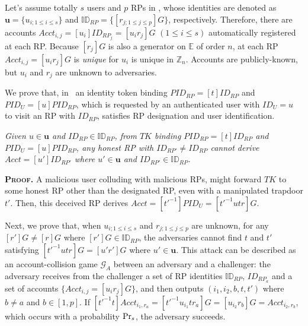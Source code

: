 
Let's assume totally $s$ users and $p$ RPs in \usso,
    whose identities are denoted as $\mathbf{u} = \{u_{i; 1 \leq i \leq s}\}$ and $\mathbb{ID}_{RP} = \{[r_{j;1 \leq j \leq p}]G\}$, respectively.
Therefore, there are accounts $Acct_{i,j}=[u_i]ID_{RP_j} = [u_i r_j]G$ $(1 \leq i \leq s)$ automatically registered at each RP.
Because $[r_j]G$ is also a generator on $\mathbb{E}$ of order $n$,
    at each RP $Acct_{i,j}=[u_i r_j]G$ is \emph{unique} for $u_i$ is unique in $\mathbb{Z}_n$.
Accounts are publicly-known, but $u_{i}$ and $r_{j}$ are unknown to adversaries.

We prove that, in \usso\ 
an identity token binding $PID_{RP} = [t]ID_{RP}$ and $PID_U = [u]PID_{RP}$, which is requested by an authenticated user with $ID_U =u$ to visit an RP with $ID_{RP}$,
    satisfies RP designation and user identification.

\vspace{-1.2mm}
\begin{thm}[RP Designation]
\emph{Given $u \in \mathbf{u}$ and $ID_{RP} \in \mathbb{ID}_{RP}$,
from $TK$ binding $PID_{RP}=[t]ID_{RP}$ and $PID_U = [u]PID_{RP}$,
    any honest RP with ${ID_{RP'} \neq ID_{RP}}$ cannot derive $Acct = [u']ID_{RP'}$ where $u' \in \mathbf{u}$ and $ID_{RP'} \in \mathbb{ID}_{RP}$.}\label{thm-rp-designation}
\end{thm}
\vspace{-1.2mm}

\noindent\textbf{\textsc{Proof.}} 
A malicious user colluding with malicious RPs,
    might forward $TK$ to some honest RP other than the designated RP,
        even with a manipulated trapdoor $t'$.
Then, this deceived RP derives $Acct = [t'^{-1}]PID_U = [t'^{-1}utr]G$.

Next, we prove that, when $u_{i; 1\leq i \leq s}$ and $r_{j; 1\leq j \leq p}$ are unknown,
    for any $[r']G \neq [r]G$ where $[r']G \in \mathbb{ID}_{RP}$,
    the adversaries cannot find $t$ and $t'$ satisfying $[t'^{-1}utr]G = [u'r']G$ where $u' \in \mathbf{u}$.
This attack can be described as an account-collision game $\mathcal{G}_A$ between an adversary and a challenger:
 the adversary receives from the challenger a set of RP identities $\mathbb{ID}_{RP}$,
  $ID_{RP_{a}}$ and a set of accounts $\{Acct_{i,j}= [u_ir_j]G\}$,
 and then outputs $(i_1, i_2, b, t, t')$ where $b \neq a$ and $b \in [1,p]$.
If $[t'^{-1}t]Acct_{i_1,r_a} = [t'^{-1}u_{i_1}tr_{a}]G = [u_{i_2}r_{b}]G = Acct_{i_2,r_b}$, which occurs with a probability ${\rm Pr}_s$, the adversary succeeds.

